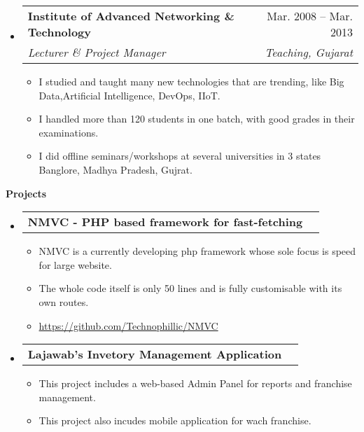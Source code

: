 \documentclass[letterpaper,12pt]{article}[leftmargin=*]
\makeatletter
\def \entryspacing {-0pt}
\renewcommand{\section}[2]{\vspace{5pt}
  \colorbox{secondary}{\color{white}\raggedbottom\normalsize\textbf{{#1}{\hspace{7pt}#2}}}
}
\newcommand{\resumeEntryStart}{\begin{itemize}[leftmargin=2.5mm]}
\newcommand{\resumeEntryEnd}{\end{itemize}\vspace{\entryspacing}}
\newcommand{\resumeItemListStart}{\begin{itemize}[leftmargin=4.5mm]}
\newcommand{\resumeItemListEnd}{\end{itemize}}
\newcommand{\resumeItem}[1]{
  \item\small{
    {#1 \vspace{-2pt}}
  }
}
\newcommand{\resumeEntryTSDL}[4]{
  \vspace{-1pt}\item[]
    \begin{tabularx}{0.97\textwidth}{X@{\hspace{60pt}}r}
      \textbf{\color{primary}#1} & {\firabook\color{accent}\small#2} \\
      \textit{\color{accent}\small#3} & \textit{\color{accent}\small#4} \\
    \end{tabularx}\vspace{-6pt}
}
\newcommand{\resumeEntryTD}[2]{
  \vspace{-1pt}\item[]
    \begin{tabularx}{0.97\textwidth}{X@{\hspace{60pt}}r}
      \textbf{\color{primary}#1} & {\firabook\color{accent}\small#2} \\
    \end{tabularx}\vspace{-6pt}
}
\makeatother
\begin{document}
  \resumeEntryStart
    \resumeEntryTSDL
      {Institute of Advanced Networking \& Technology}{Mar. 2008 -- Mar. 2013}
      {Lecturer \& Project Manager}{Teaching, Gujarat}
    \resumeItemListStart
      \resumeItem { I studied and taught many new technologies that are trending, like Big Data,\linebreak Artificial Intelligence, DevOps, IIoT.}
      \resumeItem{I handled more than 120 students in one batch, with good grades in their examinations.}
      \resumeItem{I did offline seminars/workshops at several universities in 3 states Banglore, Madhya Pradesh, Gujrat.}
    \resumeItemListEnd
  \resumeEntryEnd


\section{\faFlask}{Projects}

  \resumeEntryStart
    \resumeEntryTD
      {NMVC - PHP based framework for fast-fetching}{}
    \resumeItemListStart
      \resumeItem {NMVC is a currently developing php framework whose sole focus is speed for large website.}
      \resumeItem {The whole code itself is only 50 lines and is fully customisable with its own routes.}
      \resumeItem {\url{https://github.com/Technophillic/NMVC}}
    \resumeItemListEnd
  \resumeEntryEnd

  \resumeEntryStart
    \resumeEntryTD
      {Lajawab's Invetory Management Application}{}
    \resumeItemListStart
      \resumeItem {This project includes a web-based Admin Panel for reports and franchise management.}
      \resumeItem {This project also incudes mobile application for wach franchise.}
    \resumeItemListEnd
  \resumeEntryEnd

\end{document}
